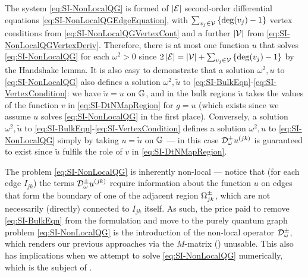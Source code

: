 The system \eqref{eq:SI-NonLocalQG} is formed of $\left\lvert \mathcal{E} \right\rvert$ second-order differential equations \eqref{eq:SI-NonLocalQGEdgeEquation}, with $\sum_{v_j\in\mathcal{V}}\left\{ \deg(v_j)-1 \right\}$ vertex conditions from \eqref{eq:SI-NonLocalQGVertexCont} and a further $\left\lvert \mathcal{V} \right\rvert$ from \eqref{eq:SI-NonLocalQGVertexDeriv}.
Therefore, there is at most one function $u$ that solves \eqref{eq:SI-NonLocalQG} for each $\omega^2>0$ since $2\left\lvert \mathcal{E} \right\rvert = \left\lvert \mathcal{V} \right\rvert + \sum_{v_j\in\mathcal{V}}\left\{ \deg(v_j)-1 \right\}$ by the Handshake lemma.
It is also easy to demonstrate that a solution $\omega^2, u$ to \eqref{eq:SI-NonLocalQG} also defines a solution $\omega^2, \tilde{u}$ to \eqref{eq:SI-BulkEqn}-\eqref{eq:SI-VertexCondition}: we have $\tilde{u}=u$ on $\mathbb{G}$, and in the bulk regions $\tilde{u}$ takes the values of the function $v$ in \eqref{eq:SI-DtNMapRegion} for $g=u$ (which exists since we assume $u$ solves \eqref{eq:SI-NonLocalQG} in the first place).
Conversely, a solution $\omega^2, \tilde{u}$ to \eqref{eq:SI-BulkEqn}-\eqref{eq:SI-VertexCondition} defines a solution $\omega^2, u$ to \eqref{eq:SI-NonLocalQG} simply by taking $u = \tilde{u}$ on $\mathbb{G}$ --- in this case $\mathcal{D}^{\pm}_\omega u^{(jk)}$ is guaranteed to exist since $\tilde{u}$ fulfils the role of $v$ in \eqref{eq:SI-DtNMapRegion}.

The problem \eqref{eq:SI-NonLocalQG} is inherently non-local --- notice that (for each edge $I_{jk}$) the terms $\mathcal{D}^{\pm}_\omega u^{(jk)}$ require information about the function $u$ on edges that form the boundary of one of the adjacent region $\Omega_{jk}^{\pm}$, which are not necessarily (directly) connected to $I_{jk}$ itself.
As such, the price paid to remove \eqref{eq:SI-BulkEqn} from the formulation and move to the purely quantum graph problem \eqref{eq:SI-NonLocalQG} is the introduction of the non-local operator $\mathcal{D}^{\pm}_\omega$, which renders our previous approaches via the $M$-matrix () unusable.
This also has implications when we attempt to solve \eqref{eq:SI-NonLocalQG} numerically, which is the subject of .

